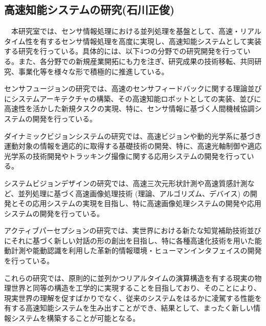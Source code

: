\subsection{高速知能システムの研究(石川正俊)}

　本研究室では、センサ情報処理における並列処理を基盤として、高速・リアルタイム性を有するセンサ情報処理を高度に実現し、高速知能システムとして実装する研究を行っている。具体的には、以下4つの分野での研究開発を行っている。また、各分野での新規産業開拓にも力を注ぎ、研究成果の技術移転、共同研究、事業化等を様々な形で積極的に推進している。

センサフュージョンの研究では、高速のセンサフィードバックに関する理論並びにシステムアーキテクチャの構築、その高速知能ロボットとしての実装、並びに高速性を活かした新規タスクの実現、特に、センサ情報に基づく人間機械協調システムの開発を行っている。

ダイナミックビジョンシステムの研究では、高速ビジョンや動的光学系に基づき運動対象の情報を適応的に取得する基礎技術の開発、特に、高速光軸制御や適応光学系の技術開発やトラッキング撮像に関する応用システムの開発を行っている。

システムビジョンデザインの研究では、高速三次元形状計測や高速質感計測など、並列処理に基づく高速画像処理技術 (理論、アルゴリズム、デバイス) の開発とその応用システムの実現を目指し、特に高速画像処理システムの開発や応用システムの開発を行っている。

アクティブパーセプションの研究では、実世界における新たな知覚補助技術並びにそれに基づく新しい対話の形の創出を目指し、特に各種高速化技術を用いた能動計測や能動認識を利用した革新的情報環境・ヒューマンインタフェイスの開発を行っている。

これらの研究では、原則的に並列かつリアルタイムの演算構造を有する現実の物理世界と同等の構造を工学的に実現することを目指しており、そのことにより、現実世界の理解を促すばかりでなく、従来のシステムをはるかに凌駕する性能を有する高速知能システムを生み出すことができ、結果として、まったく新しい情報システムを構築することが可能となる。

